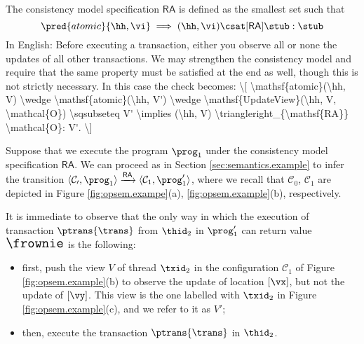 \begin{defn}
The consistency model specification $\mathsf{RA}$ is defined as the smallest set such that  
\[
\pred{atomic}{\hh, \vi} \implies (\hh, \vi) \csat[\mathsf{RA}] \stub: \stub
\]
\ac{In English: Before executing a transaction, either you observe all or none the 
updates of all other transactions. We may strengthen the consistency model and 
require that the same property must be satisfied at the end as well, though 
this is not strictly necessary. In this case the check becomes: 
\[
\mathsf{atomic}(\hh, V) \wedge \mathsf{atomic}(\hh, V') \wedge \mathsf{UpdateView}(\hh, V, \mathcal{O}) 
\sqsubseteq V' \implies (\hh, V) \triangleright_{\mathsf{RA}} \mathcal{O}: V'.
\]
}
%
\end{defn}

Suppose that we execute the program $\prog_1$ under the consistency model specification $\mathsf{RA}$.
We can proceed as in Section \ref{sec:semantics.example} to infer the transition 
$\langle \mathcal{C_0}, \prog_1 \rangle \xrightarrow{\mathsf{RA}} \langle \mathcal{C}_1, \prog_1' \rangle$, 
where we recall that $\mathcal{C}_0$, $\mathcal{C}_1$ are depicted in Figure \ref{fig:opsem.exampe}(a), 
\ref{fig:opsem.example}(b), respectively. 

It is immediate to observe that the only way in which the execution of transaction $\ptrans{\trans}$ from $\thid_2$ in $\prog_1'$ can return value ${\Large \frownie}$ is the following: 
\begin{itemize}
\item first, push the view $V$ of thread $\txid_2$ in the configuration 
$\mathcal{C}_1$ of Figure \ref{fig:opsem.example}(b) to observe the update of location $[\vx]$, but not the update of 
$[\vy]$. This view is the one labelled with $\txid_2$ in Figure \ref{fig:opsem.example}(c), and we refer 
to it as $V'$;
\item then, execute the transaction $\ptrans{\trans}$ in $\thid_2$. 
\end{itemize}

